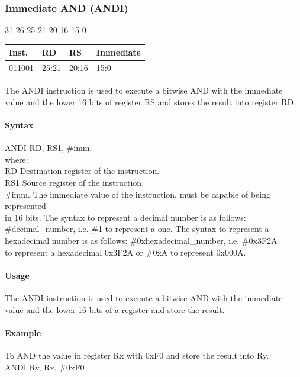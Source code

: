 \documentclass[12pt]{article}
\newcommand{\iTypeInstruction}[6]
{%
    \hspace{1.6cm}31 \hspace{1.15cm}26 \hspace{.05cm}25 \hspace{.8cm}21 \hspace{.05cm}20 \hspace{.8cm}16 \hspace{.05cm}15 \hspace{6.4cm}0
    \vspace{-.25cm}
    \begin{center}
        \begin{tabular}{ |p{1.8cm}|p{1.5cm}|p{1.5cm}|p{6.8cm}| }
            \hline
            \textbf{Inst.} & \textbf{RD} &  \textbf{RS} & \textbf{Immediate}\\
            \hline
            #1 & 25:21 & 20:16 &15:0\\
            \hline
        \end{tabular}
    \end{center}
    
    \noindent
    #2
    
    \paragraph{Syntax}
    \begin{flushleft}
    #3 RD, RS1, \#imm.\\
    \vspace{1em}        %
    where:\\
    \vspace{1em}
    RD  \hspace{3.6em} Destination register of the instruction.\\
    \vspace{1em}
    RS1  \hspace{3.35em} Source register of the instruction.\\
    \vspace{1em}
    \#imm.  \hspace{1.8em} The immediate value of the instruction, must be capable of being represented\\             \hspace{5.4em} in 16 bits. The syntax to represent a decimal number is as follows:\\
            \hspace{5.4em} \#decimal\_number, i.e. \#1 to represent a one. The syntax to represent a\\
            \hspace{5.4em} hexadecimal number is as follows: \#0xhexadecimal\_number, i.e. \#0x3F2A \\
            \hspace{5.4em} to represent a hexadecimal 0x3F2A or \#0xA to represent 0x000A.\\
    \end{flushleft}
    
    \paragraph{Usage}
    \begin{flushleft}
    #4\\
    \end{flushleft}
    \paragraph{Example}
    \begin{flushleft}
    #5\\
    \vspace{1em}
    #6
    \end{flushleft}}
\begin{document}
    


    \newpage
    \subsubsection{Immediate AND (ANDI)}
    
    \iTypeInstruction
    {011001}
    {The ANDI instruction is used to execute a bitwise AND with the immediate value and the lower 16 bits of register RS and stores the result into register RD.}
    {ANDI}
    {The ANDI instruction is used to execute a bitwise AND with the immediate value and the lower 16 bits of a register and store the result.}
    {To AND the value in register Rx with 0xF0 and store the result into Ry.}
    {ANDI Ry, Rx, \#0xF0}
    
    
\end{document}
